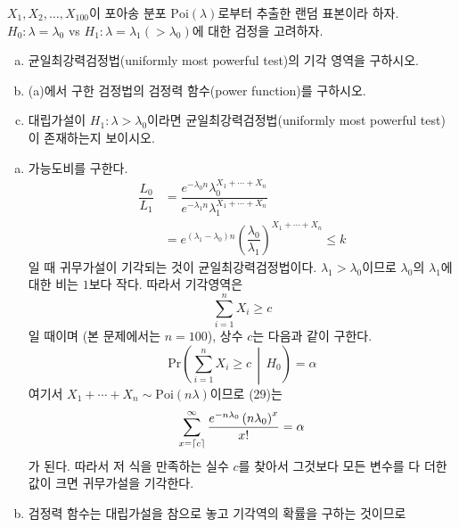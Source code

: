 \documentclass[answers]{exam}
\DeclarePairedDelimiter{\ceil}{\lceil}{\rceil}
\begin{document}
\begin{questions}
\begin{solution}
\begin{equation}
      \end{equation}
    \end{solution}
    \question
    $X_{1},X_{2},\ldots,X_{100}$이 포아송 분포 $\mathrm{Poi}\left(\lambda\right)$로부터 추출한 랜덤 표본이라 하자. $H_{0}:\lambda=\lambda_{0}$ vs $H_{1}:\lambda=\lambda_{1}(>\lambda_{0})$에 대한 검정을 고려하자.
    \begin{enumerate}[(a)]
      \item 균일최강력검정법(uniformly most powerful test)의 기각 영역을 구하시오.
      \item (a)에서 구한 검정법의 검정력 함수(power function)를 구하시오.
      \item 대립가설이 $H_{1}:\lambda>\lambda_{0}$이라면 균일최강력검정법(uniformly most powerful test)이 존재하는지 보이시오.
    \end{enumerate}
    \begin{solution}
      \begin{enumerate}[(a)]
        \item 가능도비를 구한다.
        \begin{align}
          \dfrac{L_{0}}{L_{1}}&=\dfrac{e^{-\lambda_{0}n}\lambda_{0}^{X_{1}+\cdots+X_{n}}}{e^{-\lambda_{1}n}\lambda_{1}^{X_{1}+\cdots+X_{n}}}\\
          &=e^{\left(\lambda_{1}-\lambda_{0}\right)n}\left(\dfrac{\lambda_{0}}{\lambda_{1}}\right)^{X_{1}+\cdots+X_{n}}\leq k
        \end{align}
        일 때 귀무가설이 기각되는 것이 균일최강력검정법이다. $\lambda_{1}>\lambda_{0}$이므로 $\lambda_{0}$의 $\lambda_{1}$에 대한 비는 $1$보다 작다. 따라서 기각영역은 
        \begin{equation}
          \sum_{i=1}^{n}X_{i}\geq c
        \end{equation}
        일 때이며 (본 문제에서는 $n=100$), 상수 $c$는 다음과 같이 구한다.
        \begin{equation}
          \mathrm{Pr}\left(\sum_{i=1}^{n}X_{i}\geq c\,\middle|\,H_{0}\right)=\alpha
        \end{equation}
        여기서 $X_{1}+\cdots+X_{n}\sim\mathrm{Poi}\left(n\lambda\right)$이므로 (29)는
        \begin{equation}
          \sum_{x=\ceil{c}}^{\infty}\dfrac{e^{-n\lambda_{0}}\left(n\lambda_{0}\right)^{x}}{x!}=\alpha
        \end{equation}
        가 된다. 따라서 저 식을 만족하는 실수 $c$를 찾아서 그것보다 모든 변수를 다 더한 값이 크면 귀무가설을 기각한다.
        \item 검정력 함수는 대립가설을 참으로 놓고 기각역의 확률을 구하는 것이므로

\end{enumerate}
\end{solution}
\end{questions}
\end{document}
